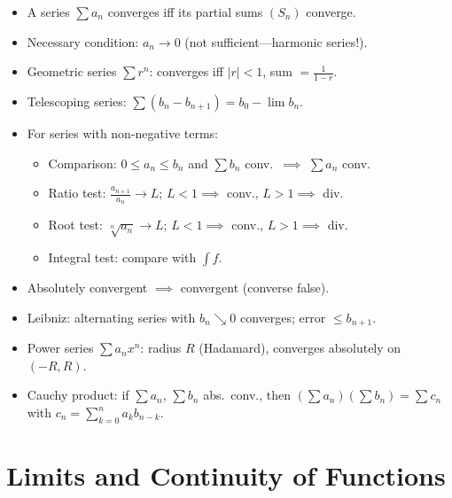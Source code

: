 \documentclass[12pt,a4paper,openany]{book}
\newcommand{\abs}[1]{\left\lvert #1 \right\rvert}
\theoremstyle{definition}
\theoremstyle{remark}
\begin{document}
\begin{tcolorbox}[
   colback=green!3!white,
   colframe=green!50!black,
   title={\textbf{Chapter 4 --- Summary}},
   fonttitle=\bfseries,
   arc=2mm
]
\begin{itemize}
\item A series $\sum a_n$ converges iff its partial sums $(S_n)$ converge.
\item Necessary condition: $a_n \to 0$ (not sufficient---harmonic series!).
\item Geometric series $\sum r^n$: converges iff $\abs{r}<1$, sum $= \frac{1}{1-r}$.
\item Telescoping series: $\sum(b_n - b_{n+1}) = b_0 - \lim b_n$.
\item For series with non-negative terms:
   \begin{itemize}
   \item Comparison: $0 \leq a_n \leq b_n$ and $\sum b_n$ conv.\ $\implies$ $\sum a_n$ conv.
   \item Ratio test: $\frac{a_{n+1}}{a_n} \to L$; $L<1 \implies$ conv., $L>1 \implies$ div.
   \item Root test: $\sqrt[n]{a_n} \to L$; $L<1 \implies$ conv., $L>1 \implies$ div.
   \item Integral test: compare with $\int f$.
   \end{itemize}
\item Absolutely convergent $\implies$ convergent (converse false).
\item Leibniz: alternating series with $b_n \searrow 0$ converges; error $\leq b_{n+1}$.
\item Power series $\sum a_n x^n$: radius $R$ (Hadamard), converges absolutely on $(-R,R)$.
\item Cauchy product: if $\sum a_n$, $\sum b_n$ abs.\ conv., then
      $(\sum a_n)(\sum b_n) = \sum c_n$ with $c_n = \sum_{k=0}^{n}a_k b_{n-k}$.
\end{itemize}
\end{tcolorbox}

\chapter{Limits and Continuity of Functions}\label{ch:limits-continuity}
\end{document}
